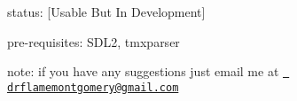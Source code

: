 status\+: \mbox{[}Usable But In Development\mbox{]}

pre-\/requisites\+: SDL2, tmxparser

note\+: if you have any suggestions just email me at \href{mailto:drflamemontgomery@gmail.com}{\texttt{ drflamemontgomery@gmail.\+com}} 